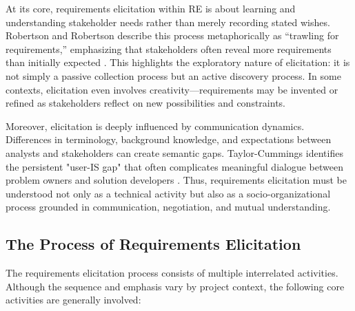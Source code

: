 At its core, requirements elicitation within RE is about learning and understanding stakeholder needs rather than merely recording stated wishes. Robertson and Robertson describe this process metaphorically as “trawling for requirements,” emphasizing that stakeholders often reveal more requirements than initially expected \cite{Robertson1999}. This highlights the exploratory nature of elicitation: it is not simply a passive collection process but an active discovery process. In some contexts, elicitation even involves creativity—requirements may be invented or refined as stakeholders reflect on new possibilities and constraints.

Moreover, elicitation is deeply influenced by communication dynamics. Differences in terminology, background knowledge, and expectations between analysts and stakeholders can create semantic gaps. Taylor-Cummings identifies the persistent "user-IS gap" that often complicates meaningful dialogue between problem owners and solution developers \cite{TaylorCummings1998}. Thus, requirements elicitation must be understood not only as a technical activity but also as a socio-organizational process grounded in communication, negotiation, and mutual understanding.

\subsection{The Process of Requirements Elicitation}

The requirements elicitation process consists of multiple interrelated activities. Although the sequence and emphasis vary by project context, the following core activities are generally involved:

